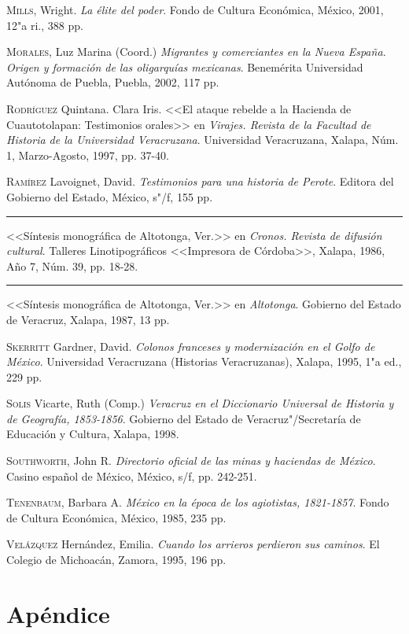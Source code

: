 \documentclass[14pt,twoside,final]{extbook} %
\begin{document}
\textsc{Mills}, Wright. \emph{La élite del poder}. Fondo de Cultura Económica, México, 2001, 12"a ri., 388 pp.

\textsc{Morales}, Luz Marina (Coord.) \emph{Migrantes y comerciantes en la Nueva España. Origen y formación de las oligarquías mexicanas}. Benemérita Universidad Autónoma de Puebla, Puebla, 2002, 117 pp.

\textsc{Rodríguez} Quintana. Clara Iris. <<El ataque rebelde a la Hacienda de Cuautotolapan: Testimonios orales>> en \emph{Virajes. Revista de la Facultad de Historia de la Universidad Veracruzana}. Universidad Veracruzana, Xalapa, Núm. 1, Marzo-Agosto, 1997, pp. 37-40.

\textsc{Ramírez} Lavoignet, David. \emph{Testimonios para una historia de Perote}. Editora del Gobierno del Estado, México, s"/f, 155 pp.

\rule{1cm}{0.4pt} <<Síntesis monográfica de Altotonga, Ver.>> en \emph{Cronos. Revista de difusión cultural}. Talleres Linotipográficos <<Impresora de Córdoba>>, Xalapa, 1986,
Año 7, Núm. 39, pp. 18-28.

\rule{1cm}{0.4pt} <<Síntesis monográfica de Altotonga, Ver.>> en \emph{Altotonga}. Gobierno del Estado de Veracruz, Xalapa, 1987, 13 pp.

\textsc{Skerritt} Gardner, David. \emph{Colonos franceses y modernización en el Golfo de México}. Universidad Veracruzana (Historias Veracruzanas), Xalapa, 1995, 1"a ed., 229 pp.

\textsc{Solis} Vicarte, Ruth (Comp.) \emph{Veracruz en el Diccionario Universal de Historia y de Geografía, 1853-1856}. Gobierno del Estado de Veracruz"/Secretaría de Educación y Cultura, Xalapa, 1998.

\textsc{Southworth}, John R. \emph{Directorio oficial de las minas y haciendas de México}. Casino español de México, México, s/f, pp. 242-251.

\textsc{Tenenbaum}, Barbara A. \emph{México en la época de los agiotistas, 1821-1857}. Fondo de Cultura Económica, México, 1985, 235 pp.

\textsc{Velázquez} Hernández, Emilia. \emph{Cuando los arrieros perdieron sus caminos}. El Colegio de Michoacán, Zamora, 1995, 196 pp.
\appendix
\chapter{Apéndice}
\thispagestyle{empty}
\pagestyle{fancy}
\fancyhf{} %
\fancyhead[RO,LE]{\thepage}
\renewcommand{\headrulewidth}{0pt}
\setcounter{page}{137}
\end{document}
